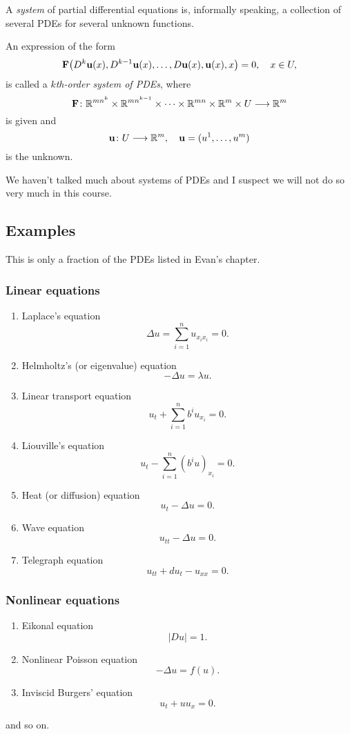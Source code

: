 A \emph{system} of partial differential equations is, informally speaking,
a collection of several PDEs for several unknown functions.

\begin{definition}
  An expression of the form
  \begin{equation}
    \label{eq:pde:k-order-system}
    \mathbf{F}\bigl(D^k\mathbf{u}(x),D^{k-1}\mathbf{u}(x),\dotsc,D\mathbf{u}(x),\mathbf{u}(x),x\bigr)=0,
    \quad x\in U,
  \end{equation}
  is called a \emph{\(k\)th-order system of PDEs}, where
  \[
    \mathbf{F}\colon\mathbb{R}^{mn^k}\times\mathbb{R}^{mn^{k-1}}\times\dotsb\times\mathbb{R}^{mn}\times\mathbb{R}^m\times
    U\longrightarrow\mathbb{R}^m
  \]
  is given and
  \[
    \mathbf{u}\colon U\longrightarrow\mathbb{R}^m,\quad\mathbf{u}=(u^1,\dotsc,u^m)
  \]
  is the unknown.
\end{definition}
\begin{remark}
  We haven't talked much about systems of PDEs and I suspect we will not do
  so very much in this course.
\end{remark}
\subsection{Examples}
This is only a fraction of the PDEs listed in Evan's chapter.

\subsubsection{Linear equations}
\begin{enumerate}[label=\arabic*.,noitemsep]
\item Laplace's equation
  \[
    \Delta u=\sum_{i=1}^n u_{x_ix_i}=0.
  \]
\item Helmholtz's (or eigenvalue) equation
  \[
    -\Delta u=\lambda u.
  \]
\item Linear transport equation
  \[
    u_t+\sum_{i=1}^n b^iu_{x_i}=0.
  \]
\item Liouville's equation
  \[
    u_t-\sum_{i=1}^n(b^iu)_{x_i}=0.
  \]
\item Heat (or diffusion) equation
  \[
    u_t-\Delta u=0.
  \]
\item Wave equation
  \[
    u_{tt}-\Delta u=0.
  \]
\item Telegraph equation
  \[
    u_{tt}+du_t-u_{xx}=0.
  \]
\end{enumerate}
\subsubsection{Nonlinear equations}
\begin{enumerate}[label=\arabic*.,noitemsep]
\item Eikonal equation
  \[
    |Du|=1.
  \]
\item Nonlinear Poisson equation
  \[
    -\Delta u=f(u).
  \]
\item Inviscid Burgers' equation
  \[
    u_t+uu_x=0.
  \]
\end{enumerate}
and so on.

